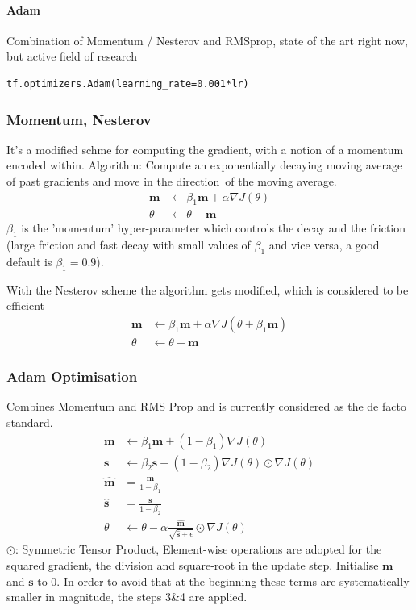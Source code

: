 \documentclass[11pt]{article}
\begin{document}
\paragraph{Adam} Combination of Momentum / Nesterov and RMSprop, state of the art right now, but active field of research
\begin{verbatim}
tf.optimizers.Adam(learning_rate=0.001*lr)
\end{verbatim}

\subsubsection{Momentum, Nesterov}
It's a modified schme for computing the gradient, with a notion of a momentum encoded within. Algorithm: Compute an exponentially decaying moving average of past gradients and move in the direction of the moving average.
\begin{align*}
	\textbf{m} &\leftarrow \beta_1 \textbf{m} +\alpha\nabla J(\theta)\\
	\theta &\leftarrow \theta - \textbf{m}
\end{align*}
$\beta_1$ is the 'momentum' hyper-parameter which controls the decay and the friction (large friction and fast decay with small values of $\beta_1$ and vice versa, a good default is $\beta_1 = 0.9$).

With the Nesterov scheme the algorithm gets modified, which is considered to be efficient
\begin{align*}
	\textbf{m} &\leftarrow \beta_1 \textbf{m} +\alpha\nabla J(\theta + \beta_1\textbf{m})\\
	\theta &\leftarrow \theta - \textbf{m}
\end{align*}

\subsubsection{Adam Optimisation}
Combines Momentum and RMS Prop and is currently considered as the de facto standard.
\begin{align*}
	\textbf{m} &\leftarrow \beta_1 \textbf{m} + (1-\beta_1)\nabla J(\theta)\\
	\textbf{s} &\leftarrow \beta_2 \textbf{s} + (1-\beta_2)\nabla J(\theta)\odot\nabla J(\theta)\\
	\widehat{\textbf{m}} &= \frac{\textbf{m}}{1-\beta_1}\\
	\widehat{\textbf{s}} &= \frac{\textbf{s}}{1-\beta_2}\\
	\theta &\leftarrow \theta - \alpha\frac{\widehat{\textbf{m}}}{\sqrt{\widehat{\textbf{s}}+\epsilon}}\odot\nabla J(\theta)
\end{align*}
$\odot$: Symmetric Tensor Product, Element-wise operations are adopted for the squared gradient, the division and square-root in the update step. Initialise $\textbf{m}$ and $\textbf{s}$ to 0. In order to avoid that at the beginning these terms are systematically smaller in magnitude, the steps 3\&4 are applied.
\end{document}
